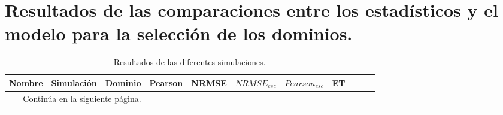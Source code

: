 \chapter{Resultados de las comparaciones entre los estadísticos y el modelo para la selección de los dominios.}\label{AnexoA}
\label{anexo:resultado_comparaciones_entre_estadisticos}
\begin{landscape}


\begin{longtable}{p{5cm}rrrrrrrrrr}
\caption{Resultados de las diferentes simulaciones.}
\label{tab:resultados_dominios}\\
\hline
   Nombre &  Simulación & Dominio &  Pearson &    NRMSE &  $NRMSE_{esc}$ &    $Pearson_{esc}$ &      ET \\
   
\midrule
\endhead
\midrule
\multicolumn{3}{r}{{Continúa en la siguiente página.}} \\
\midrule
\endfoot


\end{longtable}
\end{landscape}
